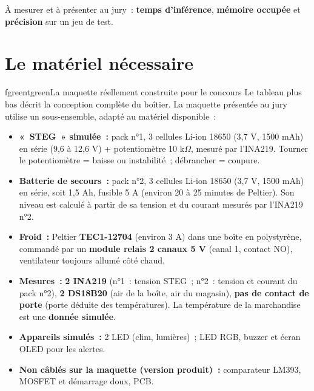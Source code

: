 \documentclass[10pt,a4paper]{article}
\begin{document}
À mesurer et à présenter au jury~: \textbf{temps d'inférence}, \textbf{mémoire occupée} et \textbf{précision} sur un jeu de test.

\section{Le matériel nécessaire}

\begin{tbox}{fgreen}{tgreen}{La maquette réellement construite pour le concours}
Le tableau plus bas décrit la conception complète du boîtier. La maquette présentée au jury utilise un sous-ensemble, adapté au matériel disponible~:
\begin{itemize}[nosep]
  \item \textbf{«~STEG~» simulée~:} pack n°1, 3 cellules Li-ion 18650 (3,7 V, 1500 mAh) en série (9,6 à 12,6 V) + potentiomètre 10 k$\Omega$, mesuré par l'INA219. Tourner le potentiomètre = baisse ou instabilité~; débrancher = coupure.
  \item \textbf{Batterie de secours~:} pack n°2, 3 cellules Li-ion 18650 (3,7 V, 1500 mAh) en série, soit 1,5 Ah, fusible 5 A (environ 20 à 25 minutes de Peltier). Son niveau est calculé à partir de sa tension et du courant mesurés par l'INA219 n°2.
  \item \textbf{Froid~:} Peltier \textbf{TEC1-12704} (environ 3 A) dans une boîte en polystyrène, commandé par un \textbf{module relais 2 canaux 5 V} (canal 1, contact NO), ventilateur toujours allumé côté chaud.
  \item \textbf{Mesures~:} \textbf{2 INA219} (n°1~: tension STEG~; n°2~: tension et courant du pack n°2), \textbf{2 DS18B20} (air de la boîte, air du magasin), \textbf{pas de contact de porte} (porte déduite des températures). La température de la marchandise est une \textbf{donnée simulée}.
  \item \textbf{Appareils simulés~:} 2 LED (clim, lumières)~; LED RGB, buzzer et écran OLED pour les alertes.
  \item \textbf{Non câblés sur la maquette (version produit)~:} comparateur LM393, MOSFET et démarrage doux, PCB.
\end{itemize}
\end{tbox}
\end{document}
